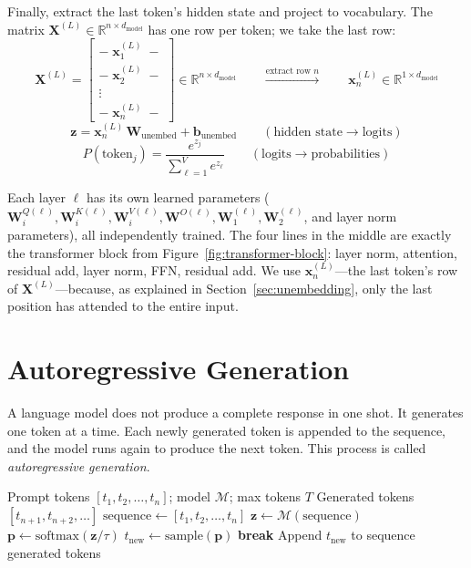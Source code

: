 Finally, extract the last token's hidden state and project to vocabulary. The matrix $\mathbf{X}^{(L)} \in \mathbb{R}^{n \times d_{\text{model}}}$ has one row per token; we take the last row:
\[
\mathbf{X}^{(L)} = \begin{bmatrix} -\;\mathbf{x}_1^{(L)}\;- \\ -\;\mathbf{x}_2^{(L)}\;- \\ \vdots \\ -\;\mathbf{x}_n^{(L)}\;- \end{bmatrix} \in \mathbb{R}^{n \times d_{\text{model}}} \qquad \xrightarrow{\text{extract row } n} \qquad \mathbf{x}_n^{(L)} \in \mathbb{R}^{1 \times d_{\text{model}}}
\]
\[
\mathbf{z} = \mathbf{x}_n^{(L)}\,\mathbf{W}_{\text{unembed}} + \mathbf{b}_{\text{unembed}} \qquad (\text{hidden state} \to \text{logits})
\]
\[
P(\text{token}_j) = \frac{e^{z_j}}{\sum_{\ell=1}^{V} e^{z_\ell}} \qquad (\text{logits} \to \text{probabilities})
\]

Each layer $\ell$ has its own learned parameters ($\mathbf{W}_i^{Q(\ell)}, \mathbf{W}_i^{K(\ell)}, \mathbf{W}_i^{V(\ell)}, \mathbf{W}^{O(\ell)}, \mathbf{W}_1^{(\ell)}, \mathbf{W}_2^{(\ell)}$, and layer norm parameters), all independently trained. The four lines in the middle are exactly the transformer block from Figure~\ref{fig:transformer-block}: layer norm, attention, residual add, layer norm, FFN, residual add. We use $\mathbf{x}_n^{(L)}$---the last token's row of $\mathbf{X}^{(L)}$---because, as explained in Section~\ref{sec:unembedding}, only the last position has attended to the entire input.

\section{Autoregressive Generation}
\label{sec:autoregressive}

%
A language model does not produce a complete response in one shot. It generates one token at a time. Each newly generated token is appended to the sequence, and the model runs again to produce the next token. This process is called \emph{autoregressive generation}.

\begin{algorithm}
\caption{Autoregressive generation (simplified)}
\label{alg:autoregressive}
\begin{algorithmic}[1]
\Require Prompt tokens $[t_1, t_2, \ldots, t_n]$; model $\mathcal{M}$; max tokens $T$
\Ensure Generated tokens $[t_{n+1}, t_{n+2}, \ldots]$
\State $\text{sequence} \gets [t_1, t_2, \ldots, t_n]$
    \State $\mathbf{z} \gets \mathcal{M}(\text{sequence})$ 
    \State $\mathbf{p} \gets \text{softmax}(\mathbf{z}/\tau)$ 
    \State $t_{\text{new}} \gets \text{sample}(\mathbf{p})$ 
        \State \textbf{break}
    \EndIf
    \State Append $t_{\text{new}}$ to sequence
\EndFor
\State \Return generated tokens
\end{algorithmic}
\end{algorithm}

